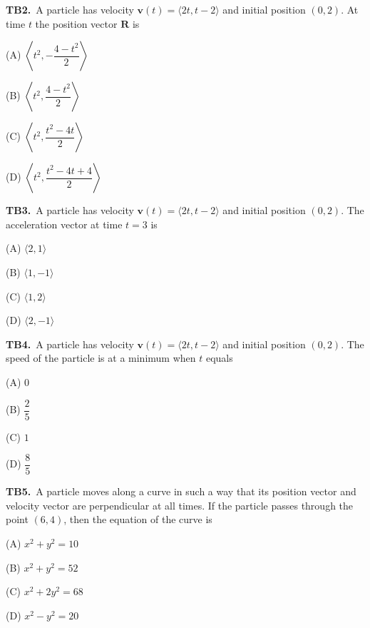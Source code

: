 \documentclass[11pt]{article}
\begin{document}
\bigskip\noindent\textbf{TB2.}\ A particle has velocity $\mathbf v(t)=\langle2t,t-2\rangle$ and initial position $(0,2)$. At time $t$ the position vector $\mathbf{R}$ is
\begin{list}{}{\setlength{\leftmargin}{3em}\setlength{\labelwidth}{2.5em}\setlength{\itemsep}{0pt}\setlength{\topsep}{2pt}}
\item[(A)] $\left\langle t^2, -\dfrac{4-t^2}{2}\right\rangle$
\item[(B)] $\left\langle t^2, \dfrac{4-t^2}{2}\right\rangle$
\item[(C)] $\left\langle t^2, \dfrac{t^2-4t}{2}\right\rangle$
\item[(D)] $\left\langle t^2, \dfrac{t^2-4t+4}{2}\right\rangle$
\end{list}

\bigskip\noindent\textbf{TB3.}\ A particle has velocity $\mathbf v(t)=\langle2t,t-2\rangle$ and initial position $(0,2)$. The acceleration vector at time $t=3$ is
\begin{list}{}{\setlength{\leftmargin}{3em}\setlength{\labelwidth}{2.5em}\setlength{\itemsep}{0pt}\setlength{\topsep}{2pt}}
\item[(A)] $\langle 2,1\rangle$
\item[(B)] $\langle 1,-1\rangle$
\item[(C)] $\langle 1,2\rangle$
\item[(D)] $\langle 2,-1\rangle$
\end{list}

\bigskip\noindent\textbf{TB4.}\ A particle has velocity $\mathbf v(t)=\langle2t,t-2\rangle$ and initial position $(0,2)$. The speed of the particle is at a minimum when $t$ equals
\begin{list}{}{\setlength{\leftmargin}{3em}\setlength{\labelwidth}{2.5em}\setlength{\itemsep}{0pt}\setlength{\topsep}{2pt}}
\item[(A)] $0$
\item[(B)] $\dfrac{2}{5}$
\item[(C)] $1$
\item[(D)] $\dfrac{8}{5}$
\end{list}

\bigskip\noindent\textbf{TB5.}\ A particle moves along a curve in such a way that its position vector and velocity vector are perpendicular at all times. If the particle passes through the point $(6,4)$, then the equation of the curve is
\begin{list}{}{\setlength{\leftmargin}{3em}\setlength{\labelwidth}{2.5em}\setlength{\itemsep}{0pt}\setlength{\topsep}{2pt}}
\item[(A)] $x^2+y^2=10$
\item[(B)] $x^2+y^2=52$
\item[(C)] $x^2+2y^2=68$
\item[(D)] $x^2-y^2=20$
\end{list}
\end{document}
